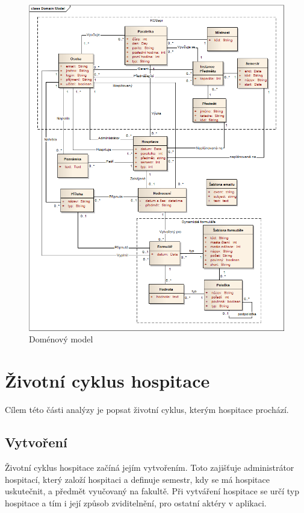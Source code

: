 \begin{figure}[p]
\begin{center}
\includegraphics[width=14cm]{figures/DomainModel2}
\caption{Doménový model}
\label{fig:domainmodel}
\end{center}
\end{figure}



\section{Životní cyklus hospitace}
Cílem této části analýzy je popsat životní cyklus, kterým hospitace prochází. 

\subsection{Vytvoření}
Životní cyklus hospitace začíná jejím vytvořením. Toto zajišťuje administrátor hospitací, který založí hospitaci a definuje semestr, kdy se má hospitace uskutečnit, a předmět vyučovaný na fakultě. Při vytváření hospitace se určí typ hospitace a tím i její způsob zviditelnění, pro ostatní aktéry v aplikaci.

